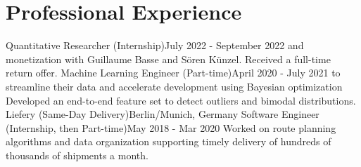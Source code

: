 \documentclass[a4paper,20pt]{article}
\begin{document}
\section{Professional Experience}
  \resumeSubHeadingListStart
    {Quantitative Researcher (Internship)}{July 2022 - September 2022}
    \resumeItemListStart
          {and monetization with Guillaume Basse and Sören Künzel. Received a full-time return offer.}
      \resumeItemListEnd
    {Machine Learning Engineer (Part-time)}{April 2020 - July 2021}
    \resumeItemListStart
          {to streamline their data and accelerate development using Bayesian optimization}
          {Developed an end-to-end feature set to detect outliers and bimodal distributions.}
      \resumeItemListEnd
    \resumeSubheading
		{Liefery (Same-Day Delivery)}{Berlin/Munich, Germany}
		{Software Engineer (Internship, then Part-time)}{May 2018 - Mar 2020}
		\resumeItemListStart
          {Worked on route planning algorithms and data organization supporting timely delivery of hundreds of thousands of shipments a month.}
		\resumeItemListEnd
\resumeSubHeadingListEnd

\vspace{-5pt}
\end{document}
